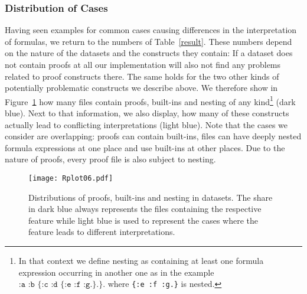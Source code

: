 \subsubsection{Distribution of Cases}\label{cases}
Having seen examples for common cases causing differences in the interpretation of \nthree formulas, we return to the numbers of Table~\ref{result}.
These numbers depend on the nature of the datasets and the constructs they contain: If a dataset does not contain proofs at all our implementation will also not find
 any problems related to proof constructs there. 
The same holds for the two other kinds of potentially problematic constructs we describe above. 
We therefore show in Figure~\ref{datasets} how many files contain proofs, built-ins and nesting of any kind\footnote{In that context we define
nesting as containing at least one formula expression occurring in another one as in the example
$\texttt{:a :b \{:c :d \{:e :f :g.\}.\}.}$
where \texttt{\{:e :f :g.\}} is nested.} (dark blue). 
Next to that information, we also display, how many of these constructs actually lead to conflicting interpretations
(light blue). %
%
Note that the cases we consider are overlapping: proofs can contain built-ins, 
files can have deeply nested formula expressions at one place and use built-ins at other places. Due to the nature of proofs, every proof file is also subject to nesting. 
\begin{figure}
 \texttt{[image: Rplot06.pdf]}
 \caption{Distributions of proofs, built-ins and nesting in datasets. The share in dark blue always represents the files containing the respective feature while light blue is used to represent the cases
 where the feature leads to different interpretations.\label{datasets}}
\end{figure}

